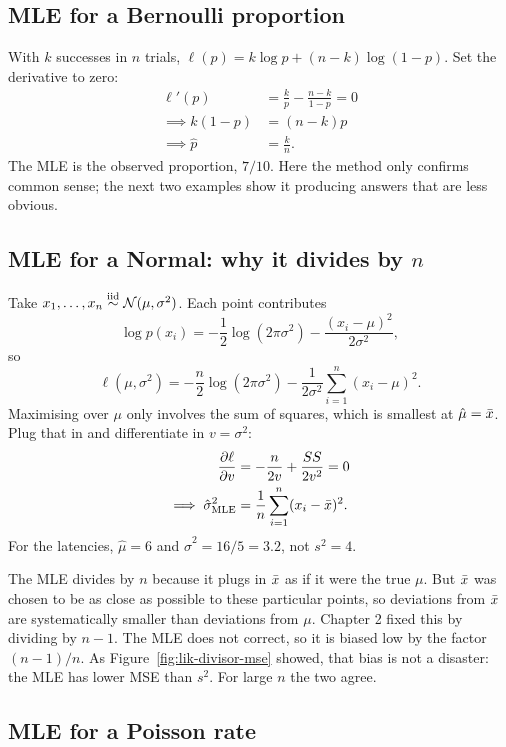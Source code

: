 \subsection{MLE for a Bernoulli proportion}

With $k$ successes in $n$ trials, $\ell(p) = k\log p + (n-k)\log(1-p)$. Set the
derivative to zero:
\begin{align*}
  \ell'(p) &= \frac{k}{p} - \frac{n-k}{1-p} = 0 \\
  \implies k(1-p) &= (n-k)p \\
  \implies \hat p &= \frac{k}{n} .
\end{align*}
The MLE is the observed proportion, $7/10$. Here the method only confirms common sense;
the next two examples show it producing answers that are less obvious.

\subsection{MLE for a Normal: why it divides by $n$}

Take $x_1,\dots,x_n \overset{\text{iid}}{\sim} \mathcal{N}(\mu,\sigma^2)$. Each point contributes
\[
  \log p(x_i) = -\frac12\log(2\pi\sigma^2) - \frac{(x_i-\mu)^2}{2\sigma^2},
\]
so
\[
  \ell(\mu,\sigma^2) = -\frac n2\log(2\pi\sigma^2)
  - \frac{1}{2\sigma^2}\sum_{i=1}^n (x_i-\mu)^2 .
\]
Maximising over $\mu$ only involves the sum of squares, which is smallest at
$\hat\mu = \bar{x}$. Plug that in and differentiate in $v=\sigma^2$:
\begin{align*}
  \frac{\partial\ell}{\partial v} &= -\frac{n}{2v} + \frac{SS}{2v^2} = 0 \\
  \implies \hat\sigma^2_{\text{MLE}} &= \frac{1}{n}\sum_{i=1}^n (x_i-\bar{x})^2 .
\end{align*}
For the latencies, $\hat\mu = 6$ and $\hat\sigma^2 = 16/5 = 3.2$, not $s^2 = 4$.

\begin{whybox}
The MLE divides by $n$ because it plugs in $\bar{x}$ as if it were the true $\mu$. But
$\bar{x}$ was chosen to be as close as possible to these particular points, so deviations
from $\bar{x}$ are systematically smaller than deviations from $\mu$. Chapter 2 fixed this
by dividing by $n-1$. The MLE does not correct, so it is biased low by the factor
$(n-1)/n$. As Figure~\ref{fig:lik-divisor-mse} showed, that bias is not a disaster: the
MLE has lower MSE than $s^2$. For large $n$ the two agree.
\end{whybox}

\subsection{MLE for a Poisson rate}

